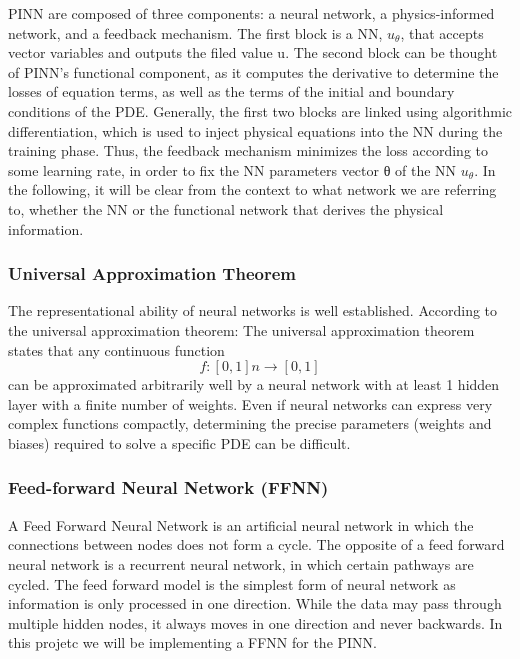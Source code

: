 \documentclass{article}
\begin{document}
PINN are composed of three components: a neural network, a physics-informed network, and a feedback mechanism. The first block is a NN, $u_θ$,
that accepts vector variables  and outputs the filed value u. The second block can be thought of PINN’s functional component, as it computes the derivative to determine the losses of equation terms,
as well as the terms of the initial and boundary conditions of the PDE. Generally, the first two blocks are linked using algorithmic differentiation, which is used to inject physical equations into 
the NN during the training phase. Thus, the feedback mechanism minimizes the loss according to some learning rate, in order to fix the NN parameters vector θ of the NN $u_θ$.
In the following, it will be clear from the context to what network we are referring to, whether the NN or the functional network that derives the physical information.



\subsubsection{Universal Approximation Theorem}

The representational ability of neural networks is well established. According to the universal approximation theorem:
The universal approximation theorem states that any continuous function  $$f : [0, 1]n \rightarrow [0, 1]$$  can be approximated arbitrarily well by a neural network with at least 1 hidden layer with a finite number of weights.
Even if neural networks can express very complex functions compactly, determining the precise parameters (weights and biases) required to solve a specific PDE can be difficult.


\subsubsection{Feed-forward Neural Network (FFNN)}

A Feed Forward Neural Network is an artificial neural network in which the connections between nodes does not form a cycle. 
The opposite of a feed forward neural network is a recurrent neural network, in which certain pathways are cycled. 
The feed forward model is the simplest form of neural network as information is only processed in one direction. While the data may pass through multiple hidden nodes, 
it always moves in one direction and never backwards. In this projetc we will be implementing a FFNN for the PINN.
\end{document}
